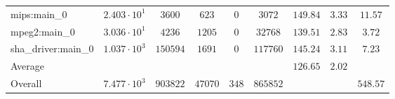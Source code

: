 \begin{tabular}{|l|c|c|c|c|c|c|c|c|}
mips:main\_0            & $ 2.403 \cdot 10^{1} $ & $ 3600   $ & $ 623   $ & $ 0   $ & $ 3072   $ & $ 149.84      $ & $ 3.33    $ & $ 11.57   $ \\
mpeg2:main\_0           & $ 3.036 \cdot 10^{1} $ & $ 4236   $ & $ 1205  $ & $ 0   $ & $ 32768  $ & $ 139.51      $ & $ 2.83    $ & $ 3.72    $ \\
sha\_driver:main\_0     & $ 1.037 \cdot 10^{3} $ & $ 150594 $ & $ 1691  $ & $ 0   $ & $ 117760 $ & $ 145.24      $ & $ 3.11    $ & $ 7.23    $ \\
\hline
Average                 & $                    $ & $        $ & $       $ & $     $ & $        $ & $ 126.65      $ & $ 2.02    $ & $         $ \\
\hline
Overall                 & $ 7.477 \cdot 10^{3} $ & $ 903822 $ & $ 47070 $ & $ 348 $ & $ 865852 $ & $             $ & $         $ & $ 548.57  $ \\
\hline
\end{tabular}
